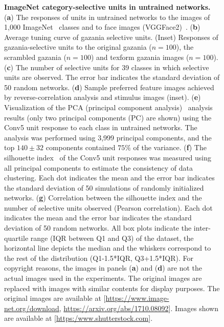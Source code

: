 \documentclass[final,3p,times,twocolumn]{elsarticle}
\begin{document}
\begin{figure}[htbp]
	\centering
	\caption{
		\textbf{ImageNet category-selective units in untrained networks.
		}
	(\textbf{a}) The responses of units in untrained networks to the images of 1,000 ImageNet~\cite{ILSVRC15} classes and to face images (VGGFace2)~\cite{cao2018vggface2}.
	(\textbf{b}) Average tuning curve of gazania selective units.
	(Inset) Responses of gazania-selective units to the original gazania ($ n = 100 $), the scrambled gazania ($ n = 100 $) and texform gazania images ($ n = 100 $).
	(\textbf{c}) The number of selective units for 39 classes in which selective units are observed.
	The error bar indicates the standard deviation of 50 random networks.
	(\textbf{d}) Sample preferred feature images achieved by reverse-correlation analysis and stimulus images (inset).
	(\textbf{e}) Visualization of the PCA (principal component analysis)~\cite{wold1987principal} analysis results (only two principal components (PC) are shown) using the Conv5 unit response to each class in untrained networks.
	The analysis was performed using 3,999 principal components, and the top $140 \pm 32$ components contained $ 75\% $ of the variance.
	(\textbf{f}) The silhouette index~\cite{kaufman2009finding} of the Conv5 unit responses was measured using all principal components to estimate the consistency of data clustering.
	Each dot indicates the mean and the error bar indicates the standard deviation of 50 simulations of randomly initialized networks.
	(\textbf{g}) Correlation between the silhouette index and the number of selective units observed (Pearson correlation).
	Each dot indicates the mean and the error bar indicates the standard deviation of 50 random networks.
	All box plots indicate the inter-quartile range (IQR between Q1 and Q3) of the dataset, the horizontal line depicts the median and the whiskers correspond to the rest of the distribution (Q1-1.5*IQR, Q3+1.5*IQR).
	For copyright reasons, the images in panels (\textbf{a}) and (\textbf{d}) are not the actual images used in the experiments.
	The original images are replaced with images with similar contents for display purposes.
	The original images are available at [\url{https://www.image-net.org/download}, \url{https://arxiv.org/abs/1710.08092}].
	Images shown are available at [\url{https:/www.shutterstock.com}].
	}
	\label{fig:image_net}
\end{figure}
\end{document}
